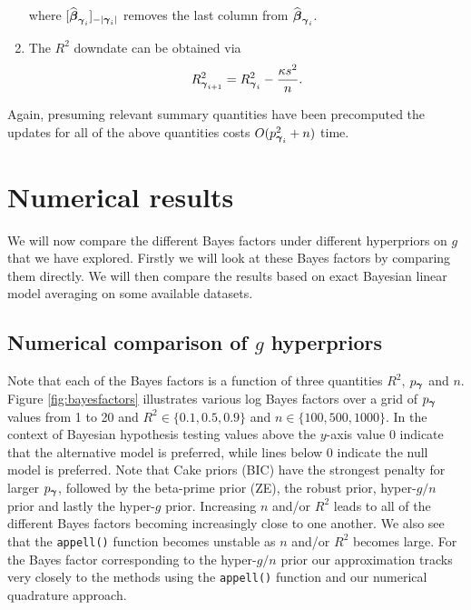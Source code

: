 \begin{enumerate}
	\noindent where $[ \widehat{{\boldsymbol \beta}}_{{\boldsymbol \gamma}_{i}}]_{-|{{\boldsymbol \gamma}_{i}}|}$
	removes the last column from $\widehat{{\boldsymbol \beta}}_{{\boldsymbol \gamma}_{i}}$.
	
	\item 
	The $R^2$ downdate can be obtained
	via
	$$
	R_{{\boldsymbol \gamma}_{i+1}}^2 = R_{{\boldsymbol \gamma}_{i}}^2 - \frac{\kappa s^2}{n}.
	$$
	
	
\end{enumerate}

\noindent Again, presuming relevant summary quantities have been precomputed
the updates for all of the above quantities costs $O(p_{{\boldsymbol \gamma}_{i}}^2 + n)$
time.

\section{Numerical results}
\label{sec:numerical_g_prior}

We will now compare the different Bayes factors under different hyperpriors on
$g$ that we have explored.  Firstly we will look at these Bayes factors by
comparing them directly.  We will then compare the results based on exact
Bayesian linear model averaging on some available datasets.

\subsection{Numerical comparison of $g$ hyperpriors}

Note that each of the Bayes factors is a function of three quantities $R^2$,
$p_{\boldsymbol \gamma}$ and $n$. Figure \ref{fig:bayesfactors} illustrates various log
Bayes factors over a grid of $p_{\boldsymbol \gamma}$ values from 1 to 20 and
$R^2\in\{0.1,0.5,0.9\}$ and $n \in \{100,500,1000\}$. In the context of
Bayesian hypothesis testing values above the $y$-axis value 0 indicate that the
alternative model is preferred, while lines below 0 indicate the null model is
preferred. Note that Cake priors (BIC) have the strongest penalty for larger
$p_{\boldsymbol \gamma}$, followed by the beta-prime prior (ZE), the robust prior,
hyper-$g/n$ prior and lastly the hyper-$g$ prior. Increasing $n$ and/or $R^2$
leads to all of the different Bayes factors becoming increasingly close to one
another. We also see that the {\tt appell()} function becomes unstable as $n$
and/or $R^2$ becomes large.  For the Bayes factor corresponding to the
hyper-$g/n$ prior our approximation tracks very closely to the methods using
the {\tt appell()} function and our numerical quadrature approach.

